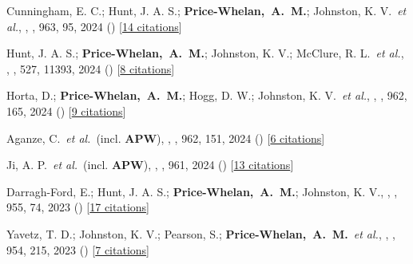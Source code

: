 \item[{\color{deemph}\scriptsize125}]Cunningham, E. C.; Hunt, J. A. S.; \textbf{Price-Whelan,~A.~M.}; Johnston, K. V.~\textit{et al.}, , \apj, 963, 95, 2024 () [\href{http://adsabs.harvard.edu/abs/2024ApJ...963...95C}{14 citations}]

\item[{\color{deemph}\scriptsize124}]Hunt, J. A. S.; \textbf{Price-Whelan,~A.~M.}; Johnston, K. V.; McClure, R. L.~\textit{et al.}, , \mnras, 527, 11393, 2024 () [\href{http://adsabs.harvard.edu/abs/2024MNRAS.52711393H}{8 citations}]

\item[{\color{deemph}\scriptsize123}]Horta, D.; \textbf{Price-Whelan,~A.~M.}; Hogg, D. W.; Johnston, K. V.~\textit{et al.}, , \apj, 962, 165, 2024 () [\href{http://adsabs.harvard.edu/abs/2024ApJ...962..165H}{9 citations}]

\item[{\color{deemph}\scriptsize122}]Aganze, C.~\textit{et al.}~(incl. \textbf{APW}), , \apj, 962, 151, 2024 () [\href{http://adsabs.harvard.edu/abs/2024ApJ...962..151A}{6 citations}]

\item[{\color{deemph}\scriptsize121}]Ji, A. P.~\textit{et al.}~(incl. \textbf{APW}), , \apj, 961, 2024 () [\href{http://adsabs.harvard.edu/abs/2024ApJ...961L..41J}{13 citations}]

\item[{\color{deemph}\scriptsize120}]Darragh-Ford, E.; Hunt, J. A. S.; \textbf{Price-Whelan,~A.~M.}; Johnston, K. V., , \apj, 955, 74, 2023 () [\href{http://adsabs.harvard.edu/abs/2023ApJ...955...74D}{17 citations}]

\item[{\color{deemph}\scriptsize119}]Yavetz, T. D.; Johnston, K. V.; Pearson, S.; \textbf{Price-Whelan,~A.~M.}~\textit{et al.}, , \apj, 954, 215, 2023 () [\href{http://adsabs.harvard.edu/abs/2023ApJ...954..215Y}{7 citations}]

